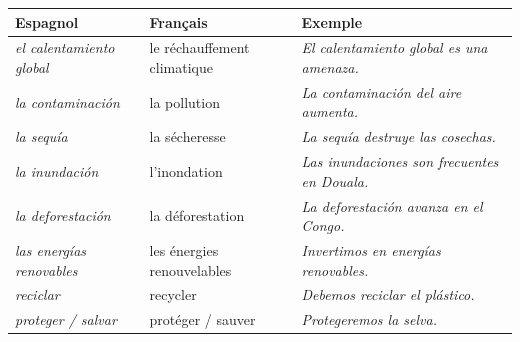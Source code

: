 \documentclass[11pt]{article}
\newcommand{\cle}[1]{{\popxbold\color{popdark}#1}}
\newcommand{\esp}[1]{\ifmmode\text{\textit{#1}}\else\begingroup\selectlanguage{spanish}\itshape #1\endgroup\fi}
\begin{document}

\begin{aretenir}
\begin{center}
\begin{tabularx}{\linewidth}{|l|X|l|}
\hline
\rowcolor{popgreenL}
\textbf{Espagnol} & \textbf{Français} & \textbf{Exemple} \\
\hline
\esp{el calentamiento global} & le réchauffement climatique & \esp{El calentamiento global es una amenaza.} \\
\esp{la contaminación} & la pollution & \esp{La contaminación del aire aumenta.} \\
\esp{la sequía} & la sécheresse & \esp{La sequía destruye las cosechas.} \\
\esp{la inundación} & l'inondation & \esp{Las inundaciones son frecuentes en Douala.} \\
\esp{la deforestación} & la déforestation & \esp{La deforestación avanza en el Congo.} \\
\esp{las energías renovables} & les énergies renouvelables & \esp{Invertimos en energías renovables.} \\
\esp{reciclar} & recycler & \esp{Debemos reciclar el plástico.} \\
\esp{proteger / salvar} & protéger / sauver & \esp{Protegeremos la selva.} \\
\hline
\end{tabularx}
\end{center}
\end{aretenir}
\end{document}
